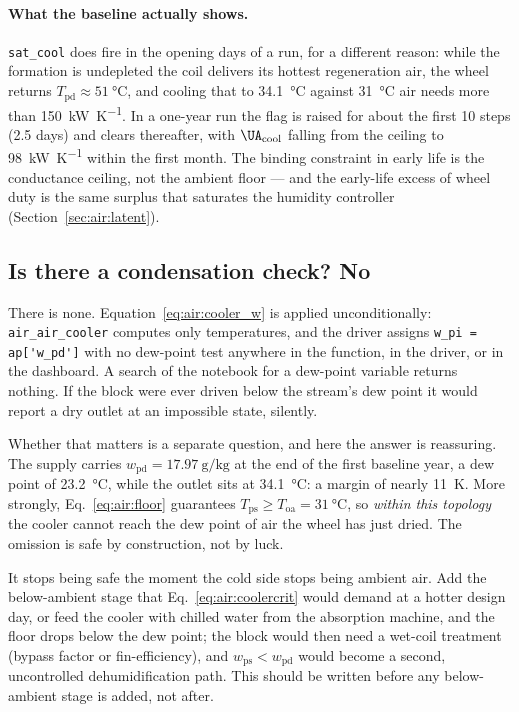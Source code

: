 \paragraph{What the baseline actually shows.} \texttt{sat\_cool} does fire in
the opening days of a run, for a different reason: while the formation is
undepleted the coil delivers its hottest regeneration air, the wheel returns
$T_{\mathrm{pd}}\approx\SI{51}{\celsius}$, and cooling that to
\SI{34.1}{\celsius} against \SI{31}{\celsius} air needs more than
\SI{150}{\kilo\watt\per\kelvin}. In a one-year run the flag is raised for about
the first \num{10} steps (\num{2.5} days) and clears thereafter, with
$\UA_{\mathrm{cool}}$ falling from the ceiling to
\SI{98}{\kilo\watt\per\kelvin} within the first month. The binding constraint
in early life is the conductance ceiling, not the ambient floor --- and the
early-life excess of wheel duty is the same surplus that saturates the humidity
controller (Section~\ref{sec:air:latent}).

\subsection{Is there a condensation check? No}
\label{sec:air:condense}

There is none. Equation~\eqref{eq:air:cooler_w} is applied unconditionally:
\texttt{air\_air\_cooler} computes only temperatures, and the driver assigns
\verb|w_pi = ap['w_pd']| with no dew-point test anywhere in the function, in
the driver, or in the dashboard. A search of the notebook for a dew-point
variable returns nothing. If the block were ever driven below the stream's dew
point it would report a dry outlet at an impossible state, silently.

Whether that matters is a separate question, and here the answer is
reassuring. The supply carries $w_{\mathrm{pd}}=\SI{17.97}{\gram\per\kilogram}$
at the end of the first baseline year, a dew point of \SI{23.2}{\celsius},
while the outlet sits at \SI{34.1}{\celsius}: a margin of nearly
\SI{11}{\kelvin}. More strongly, Eq.~\eqref{eq:air:floor} guarantees
$T_{\mathrm{ps}}\ge T_{\mathrm{oa}}=\SI{31}{\celsius}$, so \emph{within this
topology} the cooler cannot reach the dew point of air the wheel has just
dried. The omission is safe by construction, not by luck.

It stops being safe the moment the cold side stops being ambient air. Add the
below-ambient stage that Eq.~\eqref{eq:air:coolercrit} would demand at a hotter
design day, or feed the cooler with chilled water from the absorption machine,
and the floor drops below the dew point; the block would then need a wet-coil
treatment (bypass factor or fin-efficiency), and $w_{\mathrm{ps}}<
w_{\mathrm{pd}}$ would become a second, uncontrolled dehumidification path.
This should be written before any below-ambient stage is added, not after.

